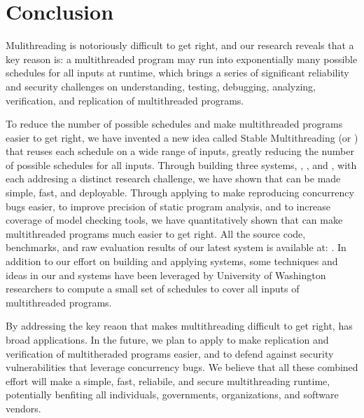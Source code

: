 \chapter{Conclusion} \label{sec:conclusion}

Mulithreading is notoriously difficult to get right, and our research reveals
that a key reason is: a multithreaded program may run into exponentially many
possible schedules for all inputs at runtime, which brings a series of
significant reliability and security challenges on understanding,
testing, debugging, analyzing, verification, and replication of multithreaded
programs.

To reduce the number of possible schedules and make multithreaded
programs easier to get right, we have invented a new idea called Stable
Multithreading (or \smt) that reuses each schedule on a wide range of inputs,
greatly reducing the number of possible schedules for all inputs. Through
building three \smt systems, \tern, \peregrine, and \parrot, with each addresing
a distinct research challenge, we have shown that \smt can be made simple, fast,
and deployable. Through applying \smt to make reproducing concurrency bugs
easier, to improve precision of static program analysis, and to increase
coverage of model checking tools, we have quantitatively shown that \smt can
make multithreaded programs much easier to get right. All the source code,
benchmarks, and raw evaluation results of our latest \smt system \parrot is
available at: \github. In addition to our effort on building and applying \smt
systems, some techniques and ideas in our \tern and \peregrine systems have been
leveraged by University of Washington researchers to compute a small set of
schedules to cover all inputs of multithreaded programs.

By addressing the key reaon that makes multithreading difficult to get right,
\smt has broad applications. In the future, we plan to apply \smt to make
replication and verification of multitheraded programs easier, and to defend
against security vulnerabilities that leverage concurrency bugs. We believe that
all these combined effort will make \smt a simple, fast, reliabile, and secure
multithreading runtime, potentially benfiting all individuals, governments,
organizations, and software vendors. 